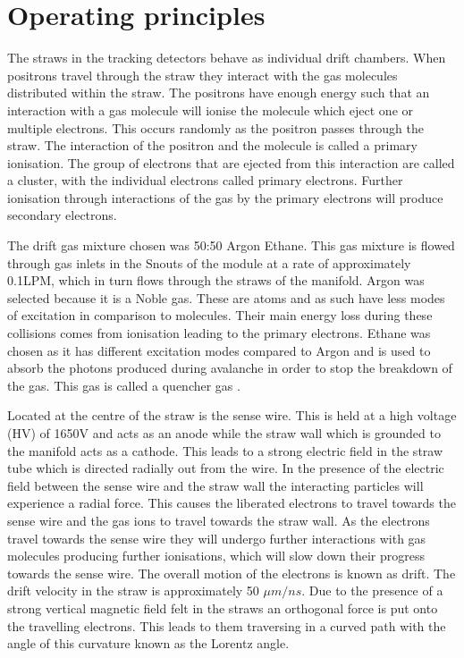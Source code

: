 \section{Operating principles}

The straws in the tracking detectors behave as individual drift chambers. When positrons travel through the straw they interact with the gas molecules distributed within the straw. The positrons have enough energy such that an interaction with a gas molecule will ionise the molecule which eject one or multiple electrons. This occurs randomly as the positron passes through the straw. The interaction of the positron and the molecule is called a primary ionisation. The group of electrons that are ejected from this interaction are called a cluster, with the individual electrons called primary electrons. Further ionisation through interactions of the gas by the primary electrons will produce secondary electrons.

The drift gas mixture chosen was 50:50 Argon Ethane. This gas mixture is flowed through gas inlets in the Snouts of the module at a rate of approximately 0.1LPM, which in turn flows through the straws of the manifold. Argon was selected because it is a Noble gas. These are atoms and as such have less modes of excitation in comparison to molecules. Their main energy loss during these collisions comes from ionisation leading to the primary electrons. Ethane was chosen as it has different excitation modes compared to Argon and is used to absorb the photons produced during avalanche in order to stop the breakdown of the gas. This gas is called a quencher gas \cite{driftchamber}.

Located at the centre of the straw is the sense wire. This is held at a high voltage (HV) of 1650V and acts as an anode while the straw wall which is grounded to the manifold acts as a cathode. This leads to a strong electric field in the straw tube which is directed radially out from the wire. In the presence of the electric field between the sense wire and the straw wall the interacting particles will experience a radial force. This causes the liberated electrons to travel towards the sense wire and the gas ions to travel towards the straw wall. As the electrons travel towards the sense wire they will undergo further interactions with gas molecules producing further ionisations, which will slow down their progress towards the sense wire. The overall motion of the electrons is known as drift. The drift velocity in the straw is approximately 50 $\mu{m}/ns$. Due to the presence of a strong vertical magnetic field felt in the straws an orthogonal force is put onto the travelling electrons. This leads to them traversing in a curved path with the angle of this curvature known as the Lorentz angle.

